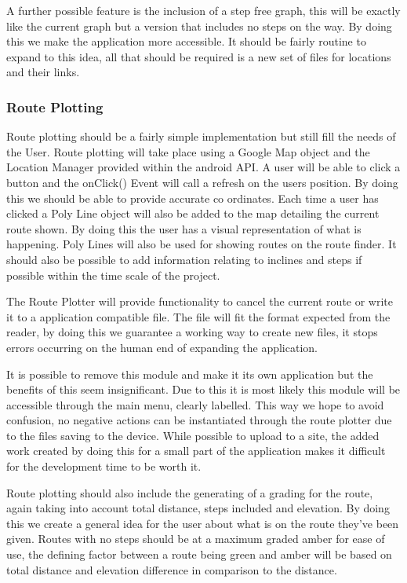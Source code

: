 A further possible feature is the inclusion of a step free graph, this will be exactly like the current graph but a version that includes no steps on the way. By doing this we make the application more accessible. It should be fairly routine to expand to this idea, all that should be required is a new set of files for locations and their links. 
\subsubsection{Route Plotting}
Route plotting should be a fairly simple implementation but still fill the needs of the User. Route plotting will take place using a Google Map object and the Location Manager provided within the android API. A user will be able to click a button and the onClick() Event will call a refresh on the users position. By doing this we should be able to provide accurate co ordinates. Each time a user has clicked a Poly Line object will also be added to the map detailing the current route shown. By doing this the user has a visual representation of what is happening. Poly Lines will also be used for showing routes on the route finder. It should also be possible to add information relating to inclines and steps if possible within the time scale of the project. 

The Route Plotter will provide functionality to cancel the current route or write it to a application compatible file. The file will fit the format expected from the reader, by doing this we guarantee a working way to create new files, it stops errors occurring on the human end of expanding the application. 

It is possible to remove this module and make it its own application but the benefits of this seem insignificant. Due to this it is most likely this module will be accessible through the main menu, clearly labelled. This way we hope to avoid confusion, no negative actions can be instantiated through the route plotter due to the files saving to the device. While possible to upload to a site, the added work created by doing this for a small part of the application makes it difficult for the development time to be worth it.

Route plotting should also include the generating of a grading for the route, again taking into account  total distance, steps included and elevation. By doing this we create a general idea for the user about what is on the route they've been given. Routes with no steps should be at a maximum graded amber for ease of use, the defining factor between a route being green and amber will be based on total distance and elevation difference in comparison to the distance. 


